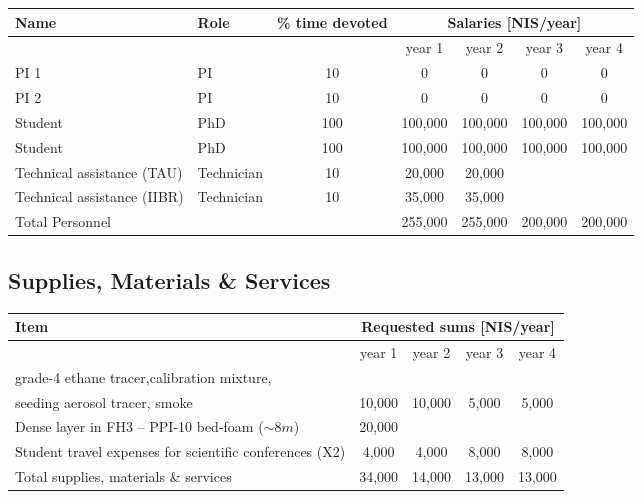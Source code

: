 \documentclass[a4paper,12pt]{report}
\begin{document}
\begin{table}[h!]
    \centering
    \begin{tabular}{|l|l|c|c|c|c|c|}
    \hline
        Name &  Role  & \% time devoted & \multicolumn{4}{|c|}{Salaries [NIS/year]} \\
        \hline
        \multicolumn{3}{|c|}{}& year 1 & year 2 & year 3 & year 4 \\
        \hline
        PI 1 & PI & 10 &  0 & 0 & 0 & 0 \\
        PI 2 & PI & 10 & 0 & 0 & 0 & 0\\
        \hline
        Student & PhD & 100 & 100,000 & 100,000 & 100,000 & 100,000 \\
        \hline
        Student & PhD & 100 & 100,000 & 100,000 & 100,000 & 100,000 \\
        \hline
        Technical assistance (TAU) & Technician  & 10 &  20,000 & 20,000&  &  \\
        \hline
        Technical assistance (IIBR) & Technician  & 10 & 35,000 & 35,000 &  &  \\
        \hline
        \hline
        Total Personnel & & &255,000 &255,000 &200,000 &200,000\\
        \hline
    \end{tabular}
\end{table}


\newpage
\subsection*{Supplies, Materials \& Services }

\begin{table}[h!]
\centering
\begin{tabular}{|l|c|c|c|c|}
\hline
Item     & \multicolumn{4}{|c|}{Requested sums [NIS/year]} \\
\hline
         & 
year 1 & year 2 & year 3 & year 4 \\
\hline
grade-4 ethane tracer,calibration mixture,& & & & \\
seeding aerosol tracer, smoke & 
10,000 & 10,000 & 5,000 & 5,000 \\
\hline
Dense layer in FH3 --  PPI-10 bed-foam ($\sim 8 m$) & 20,000 &&&\\
\hline
Student travel expenses for scientific conferences (X2) &
4,000 & 4,000 & 8,000 & 8,000 \\
\hline
\hline
Total supplies, materials \& services & 
34,000 & 14,000 & 13,000 & 13,000\\
\hline
\end{tabular}
\end{table}
\end{document}

